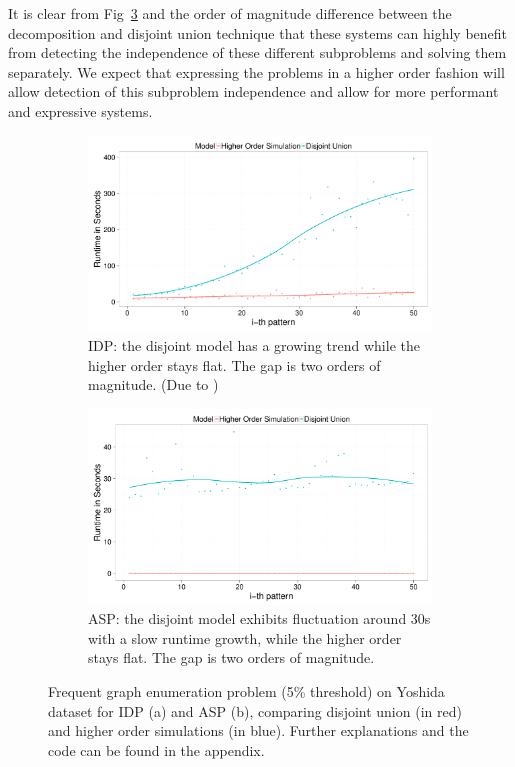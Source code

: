 It is clear from Fig~\ref{fig:decomposition_fol} and the order of magnitude difference between the decomposition and disjoint union technique that these systems can highly benefit from detecting the independence of these different subproblems and solving them separately.
We expect that expressing the problems in a higher order fashion will allow detection of this subproblem independence and allow for more performant and expressive systems.
\begin{figure}[h]
\centering
\begin{subfigure}{.44\textwidth}
  \centering
\includegraphics[scale=0.14]{extra/figure_comparison_yoshida.pdf}
\caption{\footnotesize{IDP: the disjoint model has a growing trend while the higher order stays flat. The gap is two orders of magnitude. (Due to \cite{ilp_graph_mining})}}
  \label{fig:decomposition_idp}
\end{subfigure}%
\hfill
\begin{subfigure}{0.46\textwidth}
  \centering
 \includegraphics[scale=0.14]{extra/asp_fol_vs_decomposed_yoshida.pdf}
 \caption{\footnotesize{ASP: the disjoint model exhibits fluctuation around 30s with a slow runtime growth, while the higher order stays flat. The gap is two orders of magnitude.}}
  \label{fig:decomposition_asp}
\end{subfigure}
\caption{\footnotesize{Frequent graph enumeration problem (5\% threshold) on Yoshida dataset \cite{yoshida_dataset} for IDP (a) and ASP (b), comparing disjoint union (in red) and higher order simulations (in blue). Further explanations and the code can be found in the appendix.}}
\label{fig:decomposition_fol}
\end{figure}
